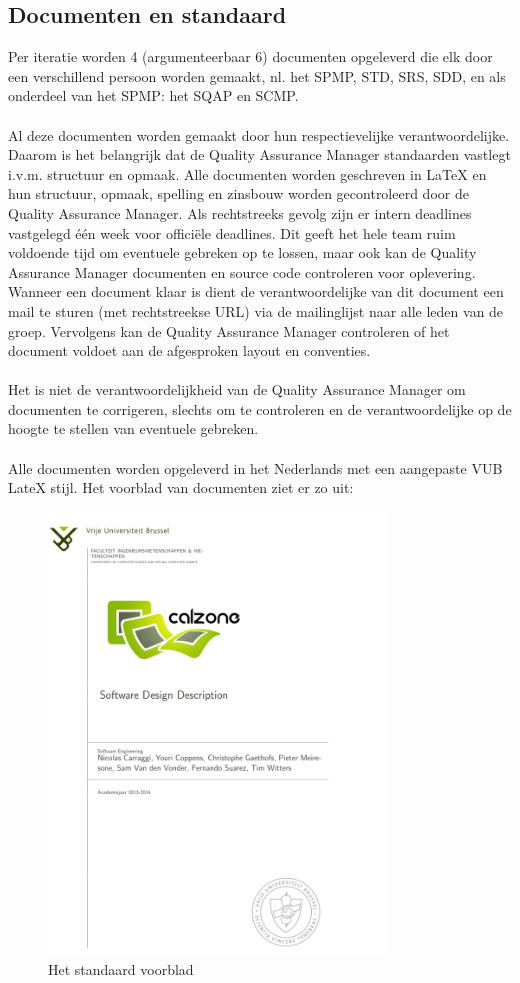 \subsection{Documenten en standaard}
Per iteratie worden 4 (argumenteerbaar 6) documenten opgeleverd die elk door een verschillend persoon worden gemaakt, nl. het SPMP, STD, SRS, SDD, en als onderdeel van het SPMP: het SQAP en SCMP.
\\
\\ 
Al deze documenten worden gemaakt door hun respectievelijke verantwoordelijke. 
Daarom is het belangrijk dat de Quality Assurance Manager standaarden vastlegt i.v.m. structuur en opmaak. 
Alle documenten worden geschreven in LaTeX en hun structuur, opmaak, spelling en zinsbouw worden gecontroleerd door de Quality Assurance Manager. 
Als rechtstreeks gevolg zijn er intern deadlines vastgelegd één week voor officiële deadlines.
Dit geeft het hele team ruim voldoende tijd om eventuele gebreken op te lossen, maar ook kan de Quality Assurance Manager documenten en source code controleren voor oplevering. 
Wanneer een document klaar is dient de verantwoordelijke van dit document een mail te sturen (met rechtstreekse URL) via de mailinglijst naar alle leden van de groep. 
Vervolgens kan de Quality Assurance Manager controleren of het document voldoet aan de afgesproken layout en conventies. 
\\
\\
Het is niet de verantwoordelijkheid van de Quality Assurance Manager om documenten te corrigeren, slechts om te controleren en de verantwoordelijke op de hoogte te stellen van eventuele gebreken. 
\\
\\
Alle documenten worden opgeleverd in het Nederlands met een aangepaste VUB LateX stijl\cite{VUBHuisstijl}. Het voorblad van documenten ziet er zo uit:

\begin{figure}[ht!]
\centering
\includegraphics[width=90mm]{SupportingProcessPlans/voorblad.png}
\caption{Het standaard voorblad}
\label{overflow}
\end{figure}

